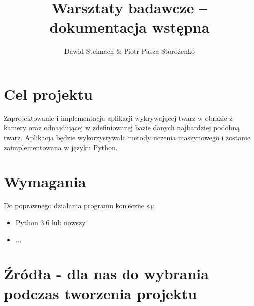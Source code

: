 \documentclass[a4paper]{mwart}
\author{Dawid Stelmach \& Piotr Pasza Storożenko}
\title{Warsztaty badawcze -- dokumentacja wstępna}
\begin{document}
\maketitle

\section{Cel projektu}

Zaprojektowanie i implementacja aplikacji wykrywającej twarz w obrazie z kamery oraz odnajdującej w zdefiniowanej bazie danych najbardziej podobną twarz. Aplikacja będzie wykorzystywała metody uczenia maszynowego i zostanie zaimplementowana w języku Python.

\section{Wymagania}

Do poprawnego działania programu konieczne są:

\begin{itemize}
	\item Python 3.6 lub nowszy
	\item ...
\end{itemize}

\section{Źródła - dla nas do wybrania podczas tworzenia projektu}
\end{document}
